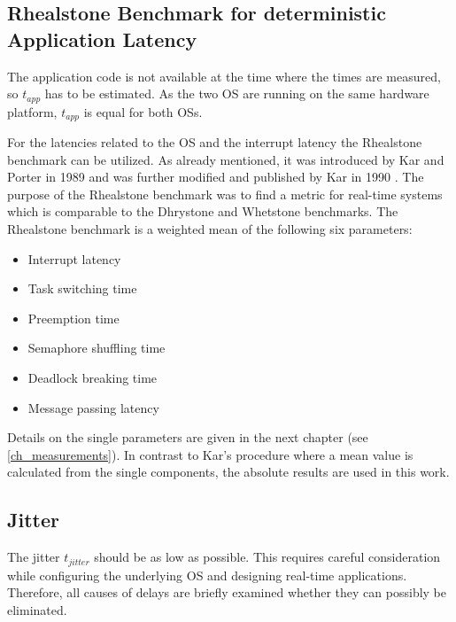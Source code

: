 \subsection{Rhealstone Benchmark for deterministic Application Latency} \label{ss_rhealstone_benchmark_for_deterministic_application_latency}
The application code is not available at the time where the times are measured, so $ t_{app} $ has to be estimated. As the two \ac{OS} are running on the same hardware platform, $ t_{app} $ is equal for both \acp{OS}.
\par
For the latencies related to the \ac{OS} and the interrupt latency the Rhealstone benchmark can be utilized. 
As already mentioned, it was introduced by Kar and Porter in 1989 \cite{kar:artbp} and was further modified and published by Kar in 1990 \cite{kar:itrb}.
The purpose of the Rhealstone benchmark was to find a metric for real-time systems which is comparable to the Dhrystone \cite{weicker:dasspb} and Whetstone \cite{wichmann:asb} benchmarks.
The Rhealstone benchmark is a weighted mean of the following six parameters:
\begin{itemize}
	\item Interrupt latency
	\item Task switching time
	\item Preemption time
	\item Semaphore shuffling time
	\item Deadlock breaking time
	\item Message passing latency
\end{itemize}
Details on the single parameters are given in the next chapter (see \ref{ch_measurements}).
In contrast to Kar's procedure where a mean value is calculated from the single components, the absolute results are used in this work. 

\subsection{Jitter}\label{ss_jitter2}
The jitter $ t_{jitter} $ should be as low as possible. 
This requires careful consideration while configuring the underlying \ac{OS} and designing real-time applications.
Therefore, all causes of delays are briefly examined whether they can possibly be eliminated.

